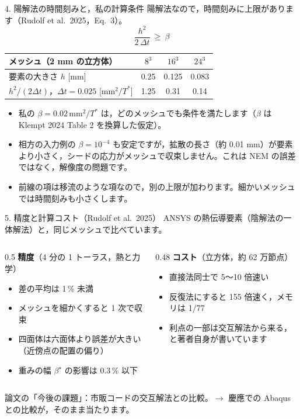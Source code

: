 \documentclass[aspectratio=169,11pt]{beamer}
\begin{document}
\begin{frame}{4. 陽解法の時間刻みと，私の計算条件}
陽解法なので，時間刻みに上限があります（Rudolf et al.\ 2025，Eq.\ 3）。
\[
  \frac{h^2}{2\,\Delta t}\ \ge\ \beta
\]
\begin{center}
\begin{tabular}{lccc}
\toprule
メッシュ（2 mm の立方体） & $8^3$ & $16^3$ & $24^3$ \\
\midrule
要素の大きさ $h$ [mm] & 0.25 & 0.125 & 0.083 \\
$h^2/(2\Delta t)$，$\Delta t=0.025$ [mm$^2/T^*$] & 1.25 & 0.31 & 0.14 \\
\bottomrule
\end{tabular}
\end{center}
\begin{itemize}
  \item 私の $\beta=0.02$\,mm$^2/T^*$ は，どのメッシュでも条件を満たします（$\beta$ は Klempt 2024 Table 2 を換算した仮定）。
  \item 相方の入力例の $\beta=10^{-4}$ も安定ですが，拡散の長さ（約 0.01 mm）が要素より小さく，シードの応力がメッシュで収束しません。これは NEM の誤差ではなく，解像度の問題です。
  \item 前線の項は移流のような項なので，別の上限が加わります。細かいメッシュでは時間刻みも小さくします。
\end{itemize}
\end{frame}

\begin{frame}{5. 精度と計算コスト（Rudolf et al.\ 2025）}
\small
ANSYS の熱伝導要素（陰解法の一体解法）と，同じメッシュで比べています。
\begin{columns}[T]
\begin{column}{0.5\textwidth}
\textbf{精度}（4 分の 1 トーラス，熱と力学）
\begin{itemize}
  \item 差の平均は 1\,\% 未満
  \item メッシュを細かくすると 1 次で収束
  \item 四面体は六面体より誤差が大きい（近傍点の配置の偏り）
  \item 重みの幅 $\beta^\star$ の影響は 0.3\,\% 以下
\end{itemize}
\end{column}
\begin{column}{0.48\textwidth}
\textbf{コスト}（立方体，約 62 万節点）
\begin{itemize}
  \item 直接法同士で 5〜10 倍速い
  \item 反復法にすると 155 倍速く，メモリは 1/77
  \item 利点の一部は交互解法から来る，と著者自身が書いています
\end{itemize}
\end{column}
\end{columns}
\vspace{8pt}
\colorbox{c3!12}{\parbox{0.97\linewidth}{\small
論文の「今後の課題」：市販コードの交互解法との比較。$\to$ 慶應での Abaqus との比較が，そのまま当たります。}}
\end{frame}
\end{document}
